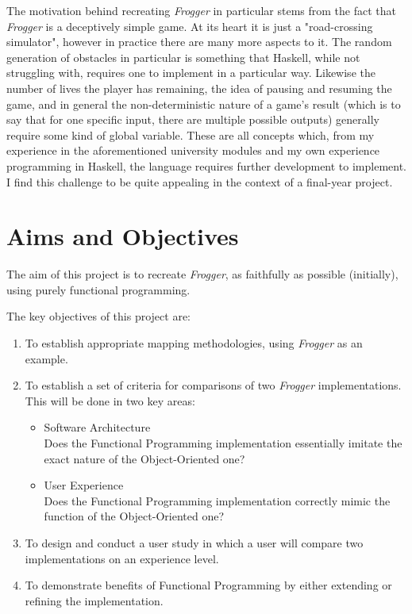 \documentclass[12pt, a4paper]{report}
\begin{document}
\par

The motivation behind recreating \textit{Frogger} in particular stems from the fact that \textit{Frogger} is a deceptively simple game.
At its heart it is just a "road-crossing simulator", however in practice there are many more aspects to it.
The random generation of obstacles in particular is something that Haskell, while not struggling with, requires one to implement in a particular way.
Likewise the number of lives the player has remaining, the idea of pausing and resuming the game, and in general the non-deterministic nature of a game's result (which is to say that for one specific input, there are multiple possible outputs) generally require some kind of global variable.
These are all concepts which, from my experience in the aforementioned university modules and my own experience programming in Haskell, the language requires further development to implement.
I find this challenge to be quite appealing in the context of a final-year project.

\section{Aims and Objectives}
The aim of this project is to recreate \textit{Frogger}, as faithfully as possible (initially), using purely functional programming.

The key objectives of this project are:
\begin{enumerate}
  \item To establish appropriate mapping methodologies, using \textit{Frogger} as an example.
  \item To establish a set of criteria for comparisons of two \textit{Frogger} implementations.\\
        This will be done in two key areas:
    \begin{itemize}
      \item Software Architecture\\
        Does the Functional Programming implementation essentially imitate the exact nature of the Object-Oriented one?
      \item User Experience\\
        Does the Functional Programming implementation correctly mimic the function of the Object-Oriented one?
    \end{itemize}
  \item To design and conduct a user study in which a user will compare two implementations on an experience level.
  \item To demonstrate benefits of Functional Programming by either extending or refining the implementation.
\end{enumerate}
\end{document}
